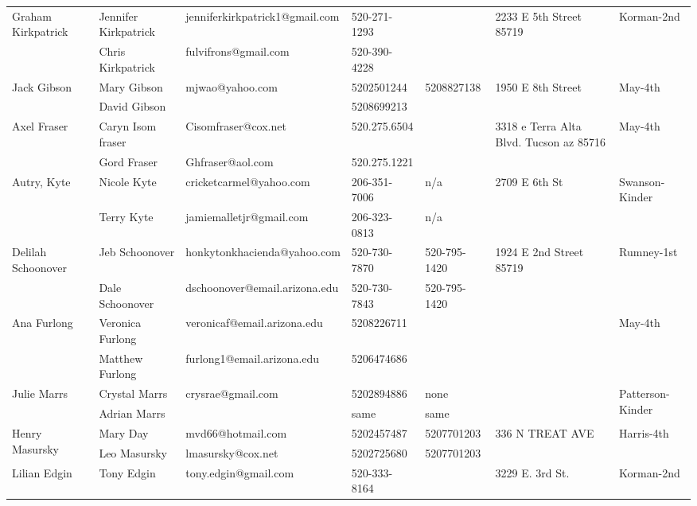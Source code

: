 \documentclass[landscape]{book}\usepackage[]{graphicx}\usepackage[]{color}
\begin{document}
\begin{longtable}{p{70pt}|p{75pt}|p{120pt}|p{60pt}|p{60pt}|p{100pt}|p{70pt}|}
\hline
\multirow{2}{70pt}{Graham Kirkpatrick} & Jennifer Kirkpatrick & jenniferkirkpatrick1@gmail.com & 520-271-1293 &  & \multirow{2}{100pt}{2233 E 5th Street 85719} & \multirow{2}{70pt}{Korman-2nd}\\
 & Chris Kirkpatrick & fulvifrons@gmail.com & 520-390-4228 &  & & \\
\hline
\multirow{2}{70pt}{Jack Gibson} & Mary Gibson & mjwao@yahoo.com & 5202501244 & 5208827138 & \multirow{2}{100pt}{1950 E 8th Street} & \multirow{2}{70pt}{May-4th}\\
 & David Gibson &  & 5208699213 &  & & \\
\hline
\multirow{2}{70pt}{Axel Fraser } & Caryn Isom fraser & Cisomfraser@cox.net & 520.275.6504 &  & \multirow{2}{100pt}{3318 e Terra Alta Blvd. Tucson az 85716 } & \multirow{2}{70pt}{May-4th}\\
 & Gord Fraser  & Ghfraser@aol.com & 520.275.1221 &  & & \\
\hline
\multirow{2}{70pt}{Autry, Kyte} & Nicole Kyte & cricketcarmel@yahoo.com & 206-351-7006 & n/a & \multirow{2}{100pt}{2709 E 6th St} & \multirow{2}{70pt}{Swanson-Kinder}\\
 & Terry Kyte & jamiemalletjr@gmail.com & 206-323-0813 & n/a & & \\
\hline
\multirow{2}{70pt}{Delilah Schoonover} & Jeb Schoonover & honkytonkhacienda@yahoo.com & 520-730-7870 & 520-795-1420 & \multirow{2}{100pt}{1924 E 2nd Street 85719} & \multirow{2}{70pt}{Rumney-1st}\\
 & Dale Schoonover & dschoonover@email.arizona.edu & 520-730-7843 & 520-795-1420 & & \\
\hline
\multirow{2}{70pt}{Ana Furlong} & Veronica Furlong & veronicaf@email.arizona.edu & 5208226711 &  & \multirow{2}{100pt}{} & \multirow{2}{70pt}{May-4th}\\
 & Matthew Furlong & furlong1@email.arizona.edu & 5206474686 &  & & \\
\hline
\multirow{2}{70pt}{Julie Marrs} & Crystal Marrs & crysrae@gmail.com & 5202894886 & none & \multirow{2}{100pt}{} & \multirow{2}{70pt}{Patterson-Kinder}\\
 & Adrian Marrs &  & same & same & & \\
\hline
\multirow{2}{70pt}{Henry Masursky} & Mary Day & mvd66@hotmail.com & 5202457487 & 5207701203 & \multirow{2}{100pt}{336 N TREAT AVE} & \multirow{2}{70pt}{Harris-4th}\\
 & Leo Masursky & lmasursky@cox.net & 5202725680 & 5207701203 & & \\
\hline
\multirow{2}{70pt}{Lilian Edgin} & Tony Edgin & tony.edgin@gmail.com & 520-333-8164 &  & \multirow{2}{100pt}{3229 E. 3rd St.} & \multirow{2}{70pt}{Korman-2nd}\\

\end{longtable}
\end{document}
